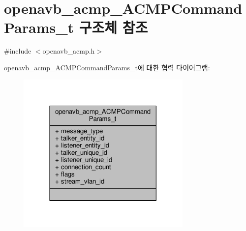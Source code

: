 \hypertarget{structopenavb__acmp___a_c_m_p_command_params__t}{}\section{openavb\+\_\+acmp\+\_\+\+A\+C\+M\+P\+Command\+Params\+\_\+t 구조체 참조}
\label{structopenavb__acmp___a_c_m_p_command_params__t}


{\ttfamily \#include $<$openavb\+\_\+acmp.\+h$>$}



openavb\+\_\+acmp\+\_\+\+A\+C\+M\+P\+Command\+Params\+\_\+t에 대한 협력 다이어그램\+:
\nopagebreak
\begin{figure}[H]
\begin{center}
\leavevmode
\includegraphics[width=242pt]{structopenavb__acmp___a_c_m_p_command_params__t__coll__graph}
\end{center}
\end{figure}
